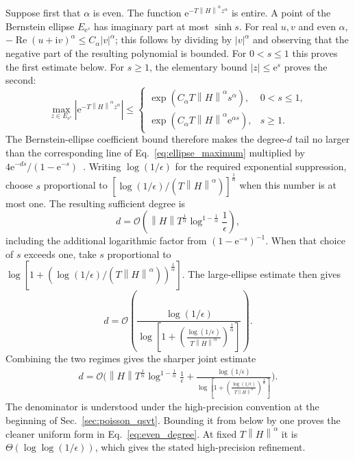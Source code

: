 \documentclass[aps,pra,reprint,floatfix,unsortedaddress,superscriptaddress]{revtex4-2}
\newcommand{\norm}[1]{\left\lVert#1\right\rVert}
\newcommand{\abs}[1]{\left\lvert#1\right\rvert}
\newcommand{\Ocal}{\mathcal{O}}
\begin{document}
Suppose first that $\alpha$ is even.  The function
$\mathrm e^{-T\norm{H}^{\alpha}z^\alpha}$ is entire.  A point of the
Bernstein ellipse $E_{\mathrm e^s}$ has imaginary part at most
$\sinh s$.  For real $u,v$ and even $\alpha$,
$-\operatorname{Re}(u+\mathrm iv)^\alpha\leq C_\alpha\abs{v}^\alpha$;
this follows by dividing by $\abs{v}^\alpha$ and observing that the
negative part of the resulting polynomial is bounded.  For
$0<s\leq1$ this proves the first estimate below.  For $s\geq1$, the
elementary bound $\abs{z}\leq\mathrm e^s$ proves the second:
\begin{equation}
    \max_{z\in E_{\mathrm e^s}}
    \abs{\mathrm e^{-T\norm{H}^{\alpha}z^\alpha}}
    \leq
    \begin{cases}
    \exp(C_\alpha T\norm{H}^{\alpha}s^\alpha),
        &0<s\leq1,\\
    \exp(C_\alpha T\norm{H}^{\alpha}\mathrm e^{\alpha s}),
        &s\geq1.
    \end{cases}
    \label{eq:ellipse_maximum}
\end{equation}
The Bernstein-ellipse coefficient bound therefore makes the
degree-$d$ tail no larger than the corresponding line of
Eq.~\eqref{eq:ellipse_maximum} multiplied by
$4\mathrm e^{-ds}/(1-\mathrm e^{-s})$~\cite{trefethen2019approximation}.
Writing $\log(1/\epsilon)$ for the required exponential
suppression, choose $s$ proportional to
$[\log(1/\epsilon)/(T\norm{H}^{\alpha})]^{\frac{1}{\alpha}}$ when
this number is at most one.  The resulting sufficient degree is
\[
    d=\Ocal\!\left(
    \norm{H}T^{\frac{1}{\alpha}}
    \log^{1-\frac{1}{\alpha}}\frac{1}{\epsilon}
    \right),
\]
    including the additional logarithmic factor from
$(1-\mathrm e^{-s})^{-1}$.  When that choice of $s$ exceeds one, take
$s$ proportional to
$\log[1+(\log(1/\epsilon)/(T\norm{H}^{\alpha}))^{\frac{1}{\alpha}}]$.
The large-ellipse estimate then gives
\[
    d=
    \Ocal\!\left(
    \frac{\log(1/\epsilon)}{
    \log\!\left[
    1+
    \left(
    \frac{\log(1/\epsilon)}
    {T\norm{H}^{\alpha}}
    \right)^{\frac{1}{\alpha}}
    \right]}
    \right).
\]
Combining the two regimes gives the sharper joint estimate
\begin{equation}
\begin{split}
d=\Ocal\!\Bigg(
\norm{H}T^{\frac{1}{\alpha}}
\log^{1-\frac{1}{\alpha}}\frac{1}{\epsilon}
+\frac{\log(1/\epsilon)}{
\log\!\left[
1+
\left(
\frac{\log(1/\epsilon)}{T\norm{H}^{\alpha}}
\right)^{\frac{1}{\alpha}}
\right]}
\Bigg).
\end{split}
\label{eq:even_degree_interpolation}
\end{equation}
The denominator is understood under the high-precision convention at
the beginning of Sec.~\ref{sec:poisson_qsvt}.  Bounding it from below by one
proves the cleaner uniform form in Eq.~\eqref{eq:even_degree}.  At
fixed $T\norm{H}^{\alpha}$ it is
$\Theta(\log\log(1/\epsilon))$, which gives the stated
high-precision refinement.
\end{document}
